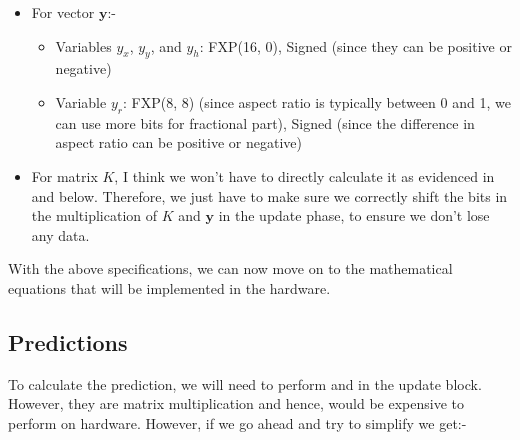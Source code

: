\documentclass[10pt]{article}
\begin{document}
\begin{itemize}
        \item For vector \(\mathbf{y}\):-
            \begin{itemize}
                \item Variables \(y_x\), \(y_y\), and \(y_h\): FXP(16, 0), Signed (since they can be positive or negative)
                \item Variable \(y_r\): FXP(8, 8) (since aspect ratio is typically between 0 and 1, we can use more bits for fractional part), 
                Signed (since the difference in aspect ratio can be positive or negative)
            \end{itemize}

        \item For matrix \(K\), I think we won't have to directly calculate it as evidenced in  and  below. Therefore, 
        we just have to make sure we correctly shift the bits in the multiplication of \(K\) and \(\mathbf{y}\) in the update phase, to ensure we don't lose any data.
    \end{itemize}

    \noindent With the above specifications, we can now move on to the mathematical equations that will be implemented in the hardware.


    \subsection{Predictions}

    To calculate the prediction, we will need to perform  and  in the update block. However, they are matrix multiplication
    and hence, would be expensive to perform on hardware. However, if we go ahead and try to simplify we get:- 
    
\end{document}
